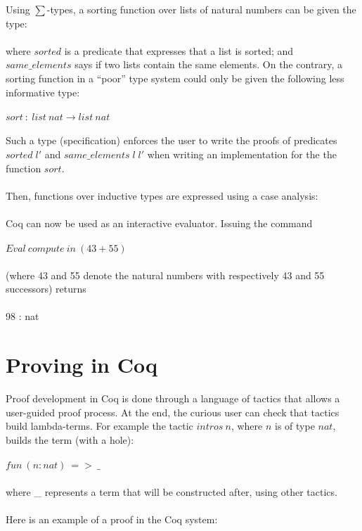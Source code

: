 \begin{itemize}
Using $\sum$-types, a sorting function over lists of natural numbers can be given the type: \\\\

\vspace{1em}
where $sorted$ is a predicate that expresses that a list is sorted; and $same\_elements$ says if two lists contain the same elements. On the contrary, a sorting function in a ``poor'' type system could only be given the following less informative type: \\\\
$sort\: :\: list\: nat \rightarrow list\: nat$ \\\\
Such a type (specification) enforces the user to write the proofs of predicates $sorted\; l'$ and $same\_elements\; l\; l'$ when writing an implementation for the the function $sort$. \\\\
Then, functions over inductive types are expressed using a case analysis: \\\\

\vspace{1em}
Coq can now be used as an interactive evaluator. Issuing the command \\\\
$Eval\: compute\: in\: (43+55)$ \\\\
(where 43 and 55 denote the natural numbers with respectively 43 and 55 successors) returns \\\\
98 : nat
\end{itemize}

\section{Proving in Coq}
Proof development in Coq is done through a language of tactics that allows a user-guided proof process. At the end, the curious user can check that tactics build lambda-terms. For example the tactic $intros\: n$, where $n$ is of type $nat$, builds the term (with a hole): \\\\
$fun\: (n:nat)\: =>\: \_$ \\\\
where \_ represents a term that will be constructed after, using other tactics. \\\\
Here is an example of a proof in the Coq system: \\\\

\vspace{1em}

